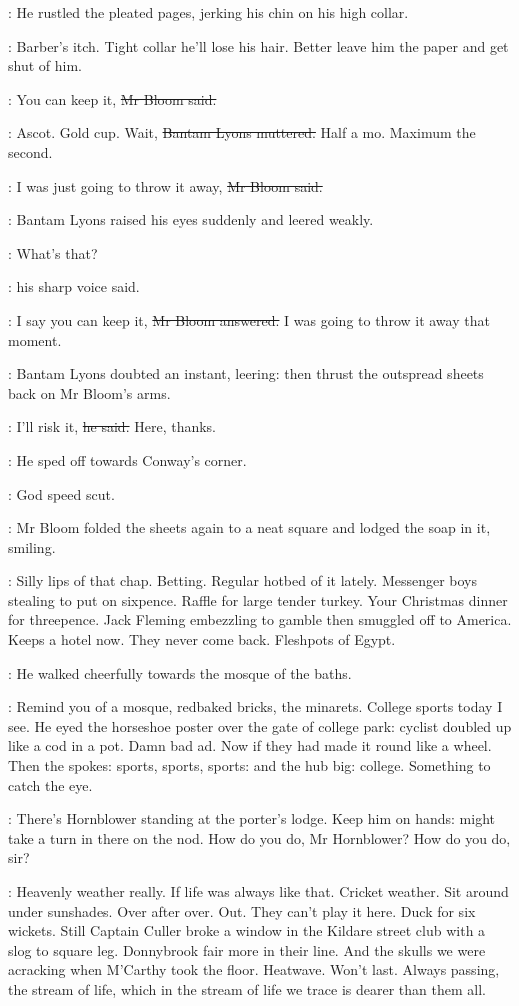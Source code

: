:
He rustled the pleated pages,
jerking his chin on his high collar.

\BloomInt:
Barber's itch.
Tight collar he'll lose his hair.
Better leave him the paper and get shut of him.

\Bloom:
You can keep it,
\sout{Mr Bloom said.}

\lyons:
Ascot.
Gold cup.
Wait,
\sout{Bantam Lyons muttered.}
Half a mo.
Maximum the second.

\Bloom:
I was just going to throw it away,
\sout{Mr Bloom said.}

:
Bantam Lyons raised his eyes suddenly and leered weakly.

\lyons:
What's that?

:
his sharp voice said.

\Bloom:
I say you can keep it,
\sout{Mr Bloom answered.}
I was going to throw it away that moment.

:
Bantam Lyons doubted an instant, leering:
then thrust the outspread sheets back on Mr Bloom's arms.

\lyons:
I'll risk it,
\sout{he said.}
Here, thanks.

:
He sped off towards Conway's corner.

\BloomInt:
God speed scut.

:
Mr Bloom folded the sheets again to a neat square
and lodged the soap in it,
smiling.

\BloomInt:
Silly lips of that chap.
Betting.
Regular hotbed of it lately.
Messenger boys stealing to put on sixpence.
Raffle for large tender turkey.
Your Christmas dinner for threepence.
Jack Fleming embezzling to gamble
then smuggled off to America.
Keeps a hotel now.
They never come back.
Fleshpots of Egypt.

:
He walked cheerfully towards the mosque of the baths.

\BloomInt:
Remind you of a mosque,
redbaked bricks, the minarets.
College sports today I see.
He eyed the horseshoe poster over the gate of college park:
cyclist doubled up like a cod in a pot.
Damn bad ad.
Now if they had made it round like a wheel.
Then the spokes:
sports, sports, sports: and the hub big:
college.
Something to catch the eye.

\BloomInt:
There's Hornblower standing at the porter's lodge.
Keep him on hands:
might take a turn in there on the nod.
How do you do, Mr Hornblower?
How do you do, sir?

\BloomInt:
Heavenly weather really.
If life was always like that.
Cricket weather.
Sit around under sunshades.
Over after over.
Out.
They can't play it here.
Duck for six wickets.
Still Captain Culler broke a window in the Kildare street club
with a slog to square leg.
Donnybrook fair more in their line.
And the skulls we were acracking when M'Carthy took the floor.
Heatwave.
Won't last.
Always passing,
the stream of life,
which in the stream of life we trace
is dearer than them all.

